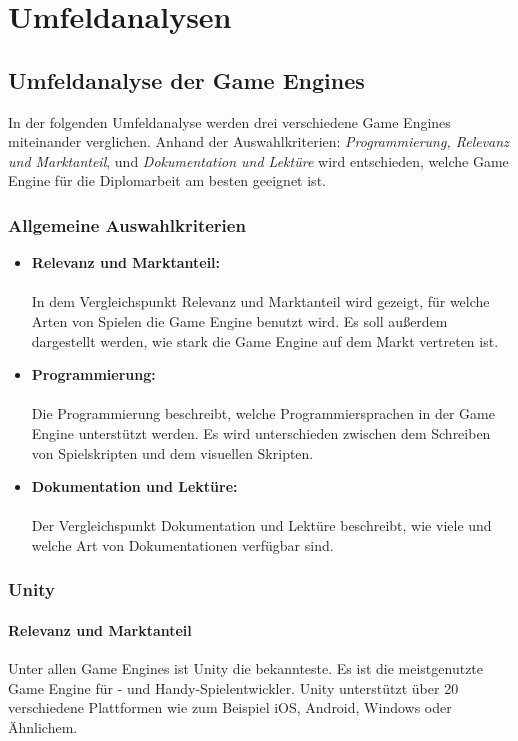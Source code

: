 \chapter{Umfeldanalysen}
\section{Umfeldanalyse der Game Engines}
In der folgenden Umfeldanalyse werden drei verschiedene Game Engines miteinander verglichen. Anhand der Auswahlkriterien: \textit{Programmierung, Relevanz und Marktanteil}, und \textit{Dokumentation und Lektüre} wird entschieden, welche Game Engine für die Diplomarbeit am besten geeignet ist.

\subsection{Allgemeine Auswahlkriterien}
\begin{itemize}
  \item \textbf{Relevanz und Marktanteil:}\\\\ In dem Vergleichspunkt Relevanz und Marktanteil wird gezeigt, für welche Arten von Spielen die Game Engine benutzt wird. Es soll außerdem dargestellt werden, wie stark die Game Engine auf dem Markt vertreten ist.
  \item \textbf{Programmierung:}\\\\ Die Programmierung beschreibt, welche Programmiersprachen in der Game Engine unterstützt werden. Es wird unterschieden zwischen dem Schreiben von Spielskripten und dem visuellen Skripten.
  \item \textbf{Dokumentation und Lektüre:}\\\\ Der Vergleichspunkt Dokumentation und Lektüre beschreibt, wie viele und welche Art von Dokumentationen verfügbar sind. 
\end{itemize}

\pagebreak

\subsection{Unity}
\subsubsection{Relevanz und Marktanteil}
Unter allen Game Engines ist Unity die bekannteste. Es ist die meistgenutzte Game Engine für - und Handy-Spielentwickler. Unity unterstützt über 20 verschiedene Plattformen wie zum Beispiel iOS, Android, Windows oder Ähnlichem.

